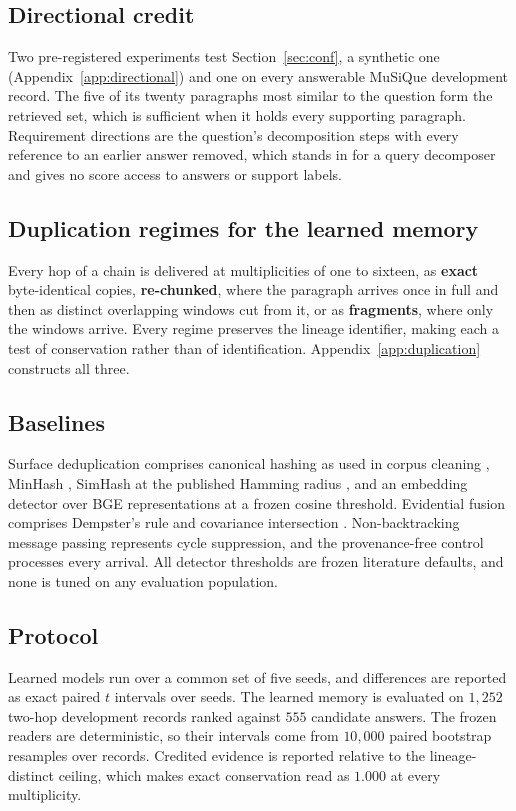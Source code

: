 \documentclass{article}
\begin{document}
\subsection{Directional credit}
Two pre-registered experiments test Section~\ref{sec:conf}, a synthetic one
(Appendix~\ref{app:directional}) and one on every answerable MuSiQue development
record. The five of its twenty paragraphs most similar to the question form the
retrieved set, which is sufficient when it holds every supporting paragraph.
Requirement directions are the question's decomposition steps with every
reference to an earlier answer removed, which stands in for a query decomposer
and gives no score access to answers or support labels.

\subsection{Duplication regimes for the learned memory}
Every hop of a chain is delivered at multiplicities of one to sixteen, as
\textbf{exact} byte-identical copies, \textbf{re-chunked}, where the paragraph
arrives once in full and then as distinct overlapping windows cut from it, or as
\textbf{fragments}, where only the windows arrive. Every regime preserves the
lineage identifier, making each a test of conservation rather than of
identification. Appendix~\ref{app:duplication} constructs all three.

\subsection{Baselines}
\label{sec:baselines}
Surface deduplication comprises canonical hashing as used in corpus cleaning
\citep{lee2022deduplicating}, MinHash \citep{broder1997resemblance}, SimHash
\citep{charikar2002simhash} at the published Hamming radius
\citep{manku2007nearduplicate}, and an embedding detector over BGE
representations \citep{xiao2023bge} at a frozen cosine threshold. Evidential
fusion comprises Dempster's rule \citep{shafer1976dempster} and covariance
intersection \citep{julier1997ci}. Non-backtracking message passing
\citep{park2024nba} represents cycle suppression, and the provenance-free
control processes every arrival. All detector thresholds are frozen literature
defaults, and none is tuned on any evaluation population.

\subsection{Protocol}
Learned models run over a common set of five seeds, and differences are reported
as exact paired $t$ intervals over seeds. The learned memory is evaluated on
$1{,}252$ two-hop development records ranked against $555$ candidate answers.
The frozen readers are deterministic, so their intervals come from $10{,}000$
paired bootstrap resamples over records. Credited evidence is reported relative
to the lineage-distinct ceiling, which makes exact conservation read as
$1.000$ at every multiplicity.
\end{document}
